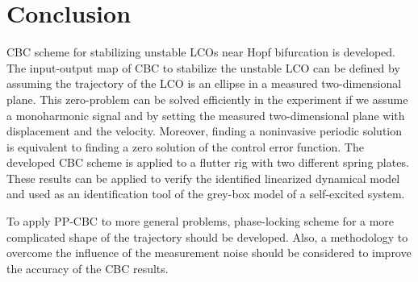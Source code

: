 \documentclass[openacc]{rsproca_new}%
\theoremstyle{own}
\begin{document}
\section{Conclusion}
CBC scheme for stabilizing unstable LCOs near Hopf bifurcation is developed. The input-output map of CBC to stabilize the unstable LCO can be defined by assuming the trajectory of the LCO is an ellipse in a measured two-dimensional plane. This zero-problem can be solved efficiently in the experiment if we assume a monoharmonic signal and by setting the measured two-dimensional plane with displacement and the velocity. Moreover, finding a noninvasive periodic solution is equivalent to finding a zero solution of the control error function. The developed CBC scheme is applied to a flutter rig with two different spring plates. These results can be applied to verify the identified linearized dynamical model and used as an identification tool of the grey-box model of a self-excited system.

To apply PP-CBC to more general problems, phase-locking scheme for a more complicated shape of the trajectory should be developed. Also, a methodology to overcome the influence of the measurement noise should be considered to improve the accuracy of the CBC results. \vskip6pt


\enlargethispage{20pt}










\end{document}
